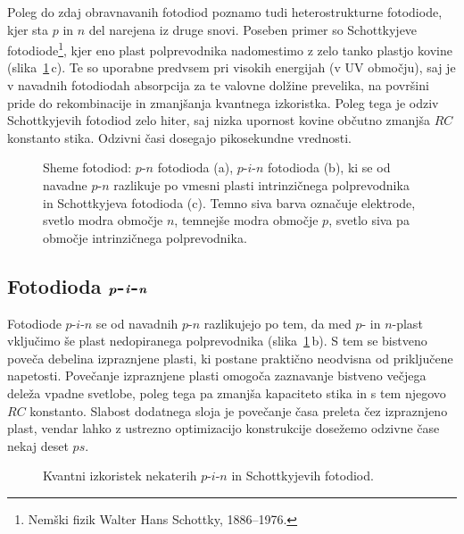 \begin{remark}
Poleg do zdaj obravnavanih fotodiod poznamo tudi heterostrukturne 
fotodiode, kjer sta $p$ in $n$ del
narejena iz druge snovi. Poseben primer so Schottkyjeve fotodiode\footnote{Nemški fizik
Walter Hans Schottky, 1886--1976.}, kjer eno plast polprevodnika
nadomestimo z zelo tanko plastjo kovine (slika~\ref{11_shema}\,c). Te so uporabne predvsem pri 
visokih energijah (v UV območju), 
saj je v navadnih fotodiodah absorpcija za te valovne dolžine prevelika, na površini pride do 
rekombinacije in zmanjšanja kvantnega izkoristka. Poleg tega je odziv Schottkyjevih fotodiod zelo hiter, 
saj nizka upornost kovine občutno zmanjša $RC$ konstanto stika. Odzivni časi dosegajo pikosekundne vrednosti. 
\end{remark}

\begin{figure}[h]
\centering
\def\svgwidth{140truemm} 

\caption{Sheme fotodiod: $p$-$n$ fotodioda (a), $p$-$i$-$n$ fotodioda (b),  ki se od 
navadne $p$-$n$ razlikuje po vmesni plasti intrinzičnega
polprevodnika in Schottkyjeva fotodioda (c). 
Temno siva barva označuje elektrode, svetlo modra območje $n$, 
temnejše modra območje $p$, svetlo siva pa območje intrinzičnega polprevodnika. }
\label{11_shema}
\end{figure}

\subsection*{Fotodioda $\textbf{\textit{p}}$-$\textbf{\textit{i}}$-$\textbf{\textit{n}}$}
Fotodiode $p$-$i$-$n$ se od navadnih $p$-$n$ razlikujejo po tem, da med $p$- in $n$-plast 
vključimo še plast nedopiranega polprevodnika (slika~\ref{11_shema}\,b). 
S tem se bistveno poveča debelina
izpraznjene plasti, ki postane praktično neodvisna od priključene napetosti.
Povečanje izpraznjene plasti omogoča zaznavanje bistveno večjega deleža vpadne svetlobe, 
poleg tega pa zmanjša kapaciteto stika in s tem njegovo $RC$ konstanto. Slabost dodatnega
sloja je povečanje časa preleta čez izpraznjeno plast, vendar lahko
z ustrezno optimizacijo konstrukcije dosežemo odzivne čase nekaj deset $\si{ps}$.

\begin{figure}[h]
\centering
\def\svgwidth{100truemm} 

\caption{Kvantni izkoristek nekaterih $p$-$i$-$n$ in Schottkyjevih fotodiod.}
\label{11_odziv}
\end{figure}

